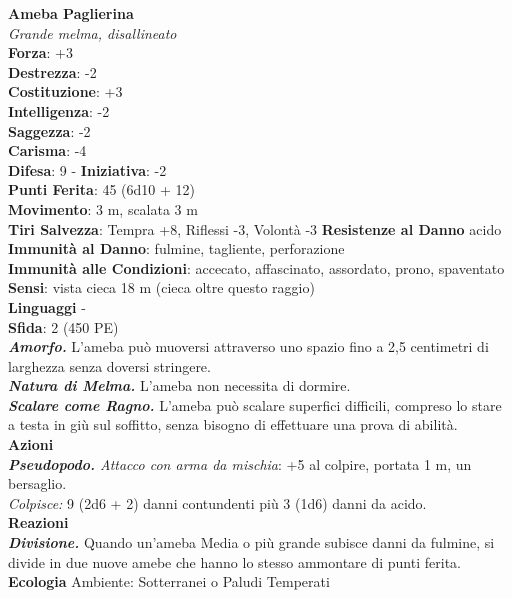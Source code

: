 \begin{multicols}{2}
\medskip\textbf{Ameba Paglierina}\\
\emph{Grande melma, disallineato}\\
\textbf{Forza}: +3\\
\textbf{Destrezza}: -2\\
\textbf{Costituzione}: +3\\
\textbf{Intelligenza}: -2\\
\textbf{Saggezza}: -2\\
\textbf{Carisma}: -4\\
\textbf{Difesa}: 9 - \textbf{Iniziativa}: -2\\
\textbf{Punti Ferita}: 45 (6d10 + 12)\\
\textbf{Movimento}: 3 m, scalata 3 m\\
\textbf{Tiri Salvezza}: Tempra +8, Riflessi -3, Volontà -3
\textbf{Resistenze al Danno} acido\\
\textbf{Immunità al Danno}: fulmine, tagliente, perforazione\\
\textbf{Immunità alle Condizioni}: accecato, affascinato, assordato, prono, spaventato\\
\textbf{Sensi}: vista cieca 18 m (cieca oltre questo raggio)\\
\textbf{Linguaggi} -\\
\textbf{Sfida}: 2 (450 PE)\smallskip\\
\emph{\textbf{Amorfo.}} L'ameba può muoversi attraverso uno spazio fino a 2,5 centimetri di larghezza senza doversi stringere.\\
\emph{\textbf{Natura di Melma.}} L'ameba non necessita di dormire.\\
\emph{\textbf{Scalare come Ragno.}} L'ameba può scalare superfici difficili, compreso lo stare a testa in giù sul soffitto, senza bisogno di effettuare una prova di abilità.\\
\smallskip\textbf{Azioni}\\
\emph{\textbf{Pseudopodo.} Attacco con arma da mischia}: +5 al colpire, portata 1 m, un bersaglio.\\
\emph{Colpisce:} 9 (2d6 + 2) danni contundenti più 3 (1d6) danni da acido.\\
\textbf{Reazioni}\\
\emph{\textbf{Divisione.}} Quando un'ameba Media o più grande subisce
danni da fulmine, si divide in due nuove amebe che hanno lo stesso ammontare di punti ferita.\\
\textbf{Ecologia}
Ambiente: Sotterranei o Paludi Temperati\\

\end{multicols}
